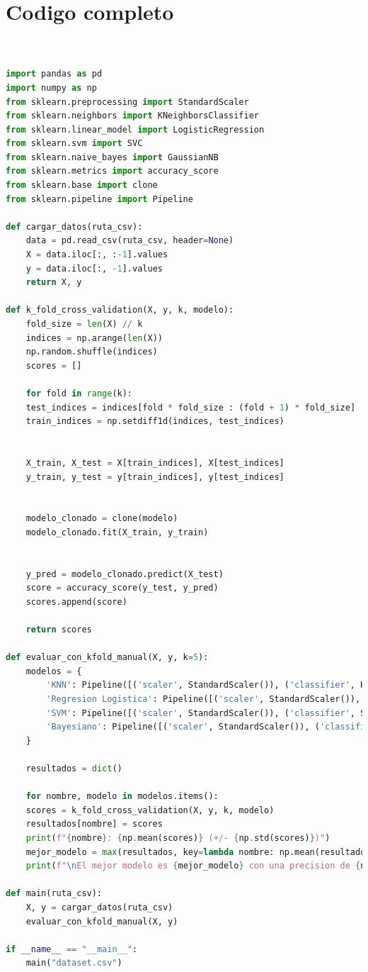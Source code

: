 \documentclass[12pt]{article}
\begin{document}
\section*{Codigo completo}
\begin{lstlisting}[language=Python]


import pandas as pd
import numpy as np
from sklearn.preprocessing import StandardScaler
from sklearn.neighbors import KNeighborsClassifier
from sklearn.linear_model import LogisticRegression
from sklearn.svm import SVC
from sklearn.naive_bayes import GaussianNB
from sklearn.metrics import accuracy_score
from sklearn.base import clone
from sklearn.pipeline import Pipeline

def cargar_datos(ruta_csv):
	data = pd.read_csv(ruta_csv, header=None)
	X = data.iloc[:, :-1].values
	y = data.iloc[:, -1].values
	return X, y

def k_fold_cross_validation(X, y, k, modelo):
	fold_size = len(X) // k
	indices = np.arange(len(X))
	np.random.shuffle(indices)
	scores = []
	
	for fold in range(k):
	test_indices = indices[fold * fold_size : (fold + 1) * fold_size]
	train_indices = np.setdiff1d(indices, test_indices)
	
	
	X_train, X_test = X[train_indices], X[test_indices]
	y_train, y_test = y[train_indices], y[test_indices]
	
	
	modelo_clonado = clone(modelo)
	modelo_clonado.fit(X_train, y_train)
	
	
	y_pred = modelo_clonado.predict(X_test)
	score = accuracy_score(y_test, y_pred)
	scores.append(score)
	
	return scores

def evaluar_con_kfold_manual(X, y, k=5):
	modelos = {
		'KNN': Pipeline([('scaler', StandardScaler()), ('classifier', KNeighborsClassifier(n_neighbors=5))]),
		'Regresion Logistica': Pipeline([('scaler', StandardScaler()), ('classifier', LogisticRegression(random_state=42))]),
		'SVM': Pipeline([('scaler', StandardScaler()), ('classifier', SVC(kernel='linear', random_state=42))]),
		'Bayesiano': Pipeline([('scaler', StandardScaler()), ('classifier', GaussianNB())])
	}
	
	resultados = dict()
	
	for nombre, modelo in modelos.items():
	scores = k_fold_cross_validation(X, y, k, modelo)
	resultados[nombre] = scores
	print(f"{nombre}: {np.mean(scores)} (+/- {np.std(scores)})")
	mejor_modelo = max(resultados, key=lambda nombre: np.mean(resultados[nombre]))
	print(f"\nEl mejor modelo es {mejor_modelo} con una precision de {np.mean(resultados[mejor_modelo])}.")

def main(ruta_csv):
	X, y = cargar_datos(ruta_csv)
	evaluar_con_kfold_manual(X, y)

if __name__ == "__main__":
	main("dataset.csv")



\end{lstlisting}
\end{document}
